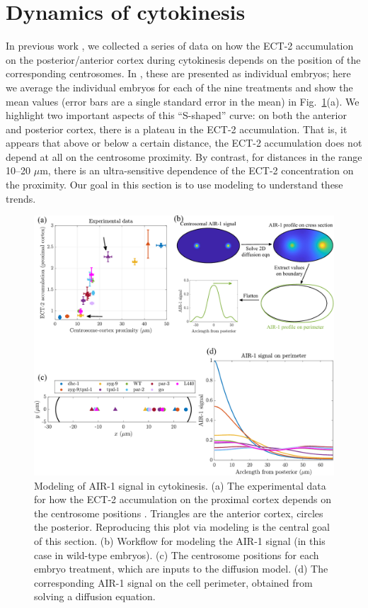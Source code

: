 \documentclass[11pt]{article}
\begin{document}
\section{Dynamics of cytokinesis}
In previous work \citep{longhini2022aurora}, we collected a series of data on how the ECT-2 accumulation on the posterior/anterior cortex during cytokinesis depends on the position of the corresponding centrosomes. In \citep[Fig.~7A]{longhini2022aurora}, these are presented as individual embryos; here we average the individual embryos for each of the nine treatments and show the mean values (error bars are a single standard error in the mean) in Fig.\ \ref{fig:CytoSit}(a). We highlight two important aspects of this ``S-shaped'' curve: on both the anterior and posterior cortex, there is a plateau in the ECT-2 accumulation. That is, it appears that above or below a certain distance, the ECT-2 accumulation does not depend at all on the centrosome proximity. By contrast, for distances in the range 10--20 $\mu$m, there is an ultra-sensitive dependence of the ECT-2 concentration on the proximity. Our goal in this section is to use modeling to understand these trends.

\begin{figure}
\centering
\includegraphics[width=\textwidth]{Glotzer/Fig2/Fig2-crop.pdf}
\caption{\label{fig:CytoSit} Modeling of AIR-1 signal in cytokinesis. (a) The experimental data for how the ECT-2 accumulation on the proximal cortex depends on the centrosome positions \citep[Fig.~7A]{longhini2022aurora}. Triangles are the anterior cortex, circles the posterior. Reproducing this plot via modeling is the central goal of this section. (b) Workflow for modeling the AIR-1 signal (in this case in wild-type embryos). (c) The centrosome positions for each embryo treatment, which are inputs to the diffusion model. (d) The corresponding AIR-1 signal on the cell perimeter, obtained from solving a diffusion equation. }
\end{figure}
\end{document}
